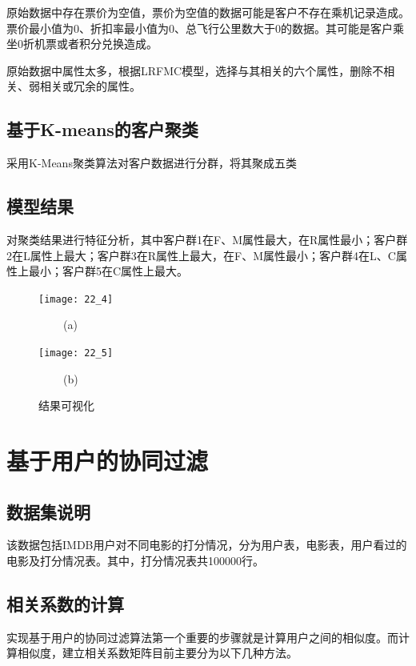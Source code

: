 \documentclass[withoutpreface,bwprint]{cumcmthesis} %
\begin{document}
\par 原始数据中存在票价为空值，票价为空值的数据可能是客户不存在乘机记录造成。票价最小值为0、折扣率最小值为0、总飞行公里数大于0的数据。其可能是客户乘坐0折机票或者积分兑换造成。


\par 原始数据中属性太多，根据LRFMC模型，选择与其相关的六个属性，删除不相关、弱相关或冗余的属性。




\subsection{基于K-means的客户聚类}

\par 采用K-Means聚类算法对客户数据进行分群，将其聚成五类

\subsection{模型结果}
\par 对聚类结果进行特征分析，其中客户群1在F、M属性最大，在R属性最小；客户群2在L属性上最大；客户群3在R属性上最大，在F、M属性最小；客户群4在L、C属性上最小；客户群5在C属性上最大。

\begin{figure}[H]
	\centering
	\begin{minipage}[t]{0.48\textwidth}
		\centering
		\texttt{[image: 22\_4]}
		\centerline{$\ \ \ \ \ \ \ \ \ \ $(a)}
	\end{minipage}
	\begin{minipage}[t]{0.48\textwidth}
		\centering
		\texttt{[image: 22\_5]}
		\centerline{$\ \ \ \ \ \ \ \ \ \ $(b)}
	\end{minipage}
	
	\caption{结果可视化}
\end{figure}

\newpage

\section{基于用户的协同过滤}
\subsection{数据集说明}
\par 该数据包括IMDB用户对不同电影的打分情况，分为用户表，电影表，用户看过的电影及打分情况表。其中，打分情况表共100000行。
\subsection{相关系数的计算}
实现基于用户的协同过滤算法第一个重要的步骤就是计算用户之间的相似度。而计算相似度，建立相关系数矩阵目前主要分为以下几种方法。
\end{document}
